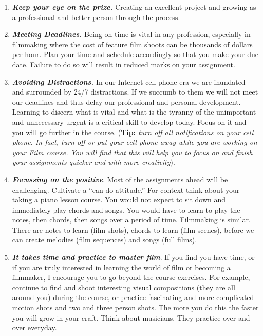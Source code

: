 \documentclass[
  letterpaper,
  DIV=11,
  numbers=noendperiod]{scrreprt}
\providecommand{\tightlist}{%
  \setlength{\itemsep}{0pt}\setlength{\parskip}{0pt}}\usepackage{longtable,booktabs,array}
\begin{document}
\begin{enumerate}
\def\labelenumi{\arabic{enumi}.}
\tightlist
\item
  \textbf{\emph{Keep your eye on the prize.}} Creating an excellent
  project and growing as a professional and better person through the
  process.
\item
  \textbf{\emph{Meeting Deadlines.}} Being on time is vital in any
  profession, especially in filmmaking where the cost of feature film
  shoots can be thousands of dollars per hour. Plan your time and
  schedule accordingly so that you make your due date. Failure to do so
  will result in reduced marks on your assignment.
\item
  \textbf{\emph{Avoiding Distractions.}} In our Internet-cell phone era
  we are inundated and surrounded by 24/7 distractions. If we succumb to
  them we will not meet our deadlines and thus delay our professional
  and personal development. Learning to discern what is vital and what
  is the tyranny of the unimportant and unnecessary urgent is a critical
  skill to develop today. Focus on it and you will go further in the
  course. (\textbf{Tip:} \emph{turn off all notifications on your cell
  phone. In fact, turn off or put your cell phone away while you are
  working on your Film course. You will find that this will help you to
  focus on and finish your assignments quicker and with more
  creativity}).
\item
  \textbf{\emph{Focussing on the positive}}. Most of the assignments
  ahead will be challenging. Cultivate a ``can do attitude.'' For
  context think about your taking a piano lesson course. You would not
  expect to sit down and immediately play chords and songs. You would
  have to learn to play the notes, then chords, then songs over a period
  of time. Filmmaking is similar. There are notes to learn (film shots),
  chords to learn (film scenes), before we can create melodies (film
  sequences) and songs (full films).
\item
  \textbf{\emph{It takes time and practice to master film}}. If you find
  you have time, or if you are truly interested in learning the world of
  film or becoming a filmmaker, I encourage you to go beyond the course
  exercises. For example, continue to find and shoot interesting visual
  compositions (they are all around you) during the course, or practice
  fascinating and more complicated motion shots and two and three person
  shots. The more you do this the faster you will grow in your craft.
  Think about musicians. They practice over and over everyday.

\end{enumerate}
\end{document}
